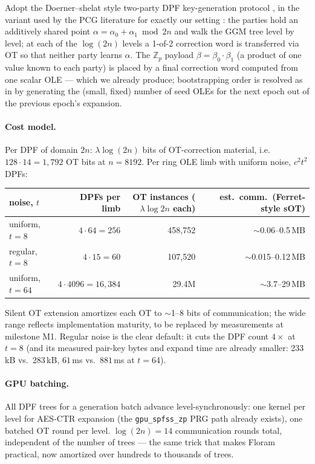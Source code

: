 \documentclass[11pt]{article}
\newcommand{\Z}{\mathbb{Z}}
\begin{document}
Adopt the Doerner--shelat style two-party DPF key-generation protocol
\cite{doerner2017floram}, in the variant used by the PCG literature for
exactly our setting \cite{boyle2019efficient,boyle2020ringlpn}: the parties
hold an additively shared point $\alpha = \alpha_0 + \alpha_1 \bmod 2n$ and
walk the GGM tree level by level; at each of the $\log(2n)$ levels a 1-of-2
correction word is transferred via OT so that neither party learns $\alpha$.
The $\Z_p$ payload $\beta = \beta_0 \cdot \beta_1$ (a product of one value
known to each party) is placed by a final correction word computed from one
scalar OLE --- which we already produce; bootstrapping order is resolved as in
\cite{boyle2020ringlpn} by generating the (small, fixed) number of seed OLEs
for the next epoch out of the previous epoch's expansion.

\paragraph{Cost model.} Per DPF of domain $2n$: $\lambda \log (2n)$ bits of
OT-correction material, i.e.\ $128 \cdot 14 = 1{,}792$ OT bits at
$n = 8192$. Per ring OLE limb with uniform noise, $c^2 t^2$ DPFs:

\begin{center}
\begin{tabular}{lrrr}
\toprule
noise, $t$ & DPFs per limb & OT instances ($\lambda\log 2n$ each) & est.\ comm.\ (Ferret-style sOT) \\
\midrule
uniform, $t{=}8$  & $4 \cdot 64 = 256$    & 458{,}752  & $\sim$0.06--0.5\,MB \\
regular, $t{=}8$  & $4 \cdot 15 = 60$     & 107{,}520  & $\sim$0.015--0.12\,MB \\
uniform, $t{=}64$ & $4 \cdot 4096 = 16{,}384$ & 29.4M  & $\sim$3.7--29\,MB \\
\bottomrule
\end{tabular}
\end{center}

Silent OT extension \cite{yang2020ferret} amortizes each OT to
$\sim$1--8 bits of communication; the wide range reflects implementation
maturity, to be replaced by measurements at milestone M1. Regular noise is
the clear default: it cuts the DPF count $4\times$ at $t{=}8$ (and its
measured pair-key bytes and expand time are already smaller:
233\,kB vs.\ 283\,kB, $61$\,ms vs.\ $881$\,ms at $t{=}64$).

\paragraph{GPU batching.} All DPF trees for a generation batch advance
level-synchronously: one kernel per level for AES-CTR expansion (the
\texttt{gpu\_spfss\_zp} PRG path already exists), one batched OT round per
level. $\log(2n) = 14$ communication rounds total, independent of the number
of trees --- the same trick that makes Floram practical, now amortized over
hundreds to thousands of trees.
\end{document}
